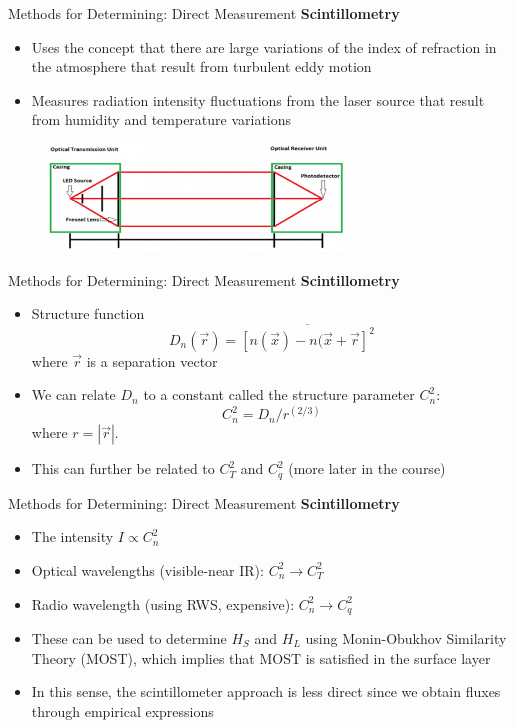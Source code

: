 
\begin{frame}{Methods for Determining: Direct Measurement}
\textbf{Scintillometry}
\begin{itemize}
	\item Uses the concept that there are large variations of the index of refraction in the atmosphere that result from turbulent eddy motion
	\item Measures radiation intensity fluctuations from the laser source that result from humidity and temperature variations
\end{itemize}
\begin{figure}
\includegraphics[width=0.7\textwidth]{fig5}	
\end{figure}
\end{frame}


\begin{frame}{Methods for Determining: Direct Measurement}
\textbf{Scintillometry}
\begin{itemize}
	\item Structure function
	$$D_n (\vec{r}) = \overline{[n(\vec{x}) - n(\vec{x} + \vec{r}]^2}$$
	where $\vec{r}$ is a separation vector
	\item We can relate $D_n$ to a constant called the structure parameter $C_n^2$:
	$$C_n^2 = D_n/r^{(2/3)}$$
	where $r=|\vec{r}|$.
	\item This can further be related to $C_T^2$ and $C_q^2$ (more later in the course)
\end{itemize}
\end{frame}


\begin{frame}{Methods for Determining: Direct Measurement}
\textbf{Scintillometry}
\begin{itemize}
	\item The intensity $I \propto C_n^2$
	\item Optical wavelengths (visible-near IR): $C_n^2 \rightarrow C_T^2$
	\item Radio wavelength (using RWS, expensive): $C_n^2 \rightarrow C_q^2$
	\item These can be used to determine $H_S$ and $H_L$ using Monin-Obukhov Similarity Theory (MOST), which implies that MOST is satisfied in the surface layer
	\item In this sense, the scintillometer approach is less direct since we obtain fluxes through empirical expressions
\end{itemize}
\end{frame}

